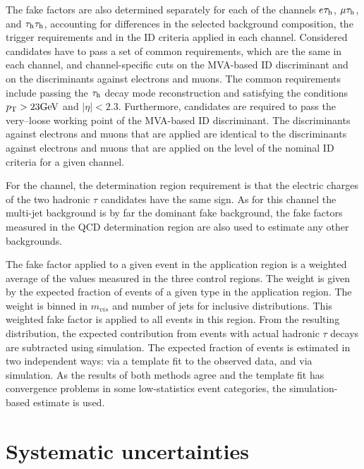 The fake factors are also determined separately for each of the channels $e\tau_{\rm h}$, $\mu\tau_{\rm h}$, and $\tau_{\rm h}\tau_{\rm h}$, accounting for differences in the selected background composition, the trigger requirements and in the \tauh ID criteria applied in each channel. Considered candidates have to pass a set of common requirements, which are the same in each channel, and channel-specific cuts on the MVA-based \tauh ID discriminant and on the discriminants against electrons and muons. The common requirements include passing the $\tau_{\rm h}$ decay mode reconstruction and satisfying the conditions $p_{\mathrm{T}} > 23 \mathrm{GeV}$ and $|\eta| < 2.3$. Furthermore, candidates are required to pass the very–loose working point of the MVA-based \tauh ID discriminant. The discriminants against electrons and muons that are applied are identical to the discriminants against electrons and muons that are applied on the level of the nominal \tauh ID criteria for a given channel.

For the \tauh\tauh channel, the determination region requirement is that the electric charges of the two hadronic $\tau$ candidates have the same sign. As for this channel the multi-jet background is by far the dominant fake background, the fake factors measured in the QCD determination region are also used to estimate any other backgrounds.

The fake factor applied to a given event in the application region is a weighted average of the values measured in the three control regions. The weight is given by the expected fraction of events of a given type in the application region. The weight is binned in $m_{vis}$ and number of jets for inclusive distributions. This weighted fake factor is applied to all events in this region. From the resulting distribution, the expected contribution from events with actual hadronic $\tau$ decays are subtracted using simulation. The expected fraction of events is estimated in two independent ways: via a template fit to the observed data, and via simulation. As the results of both methods agree and the template fit has convergence problems in some low-statistics event categories, the simulation-based estimate is used.

\section{Systematic uncertainties}
\label{sec:analysis_systematics}

